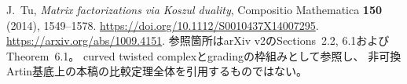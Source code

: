 J.~Tu,
\emph{Matrix factorizations via Koszul duality},
Compositio Mathematica \textbf{150} (2014), 1549--1578.
\url{https://doi.org/10.1112/S0010437X14007295}.
\url{https://arxiv.org/abs/1009.4151}.
参照箇所はarXiv v2のSections~2.2, 6.1およびTheorem~6.1。
curved twisted complexとgradingの枠組みとして参照し、
非可換Artin基底上の本稿の比較定理全体を引用するものではない。
